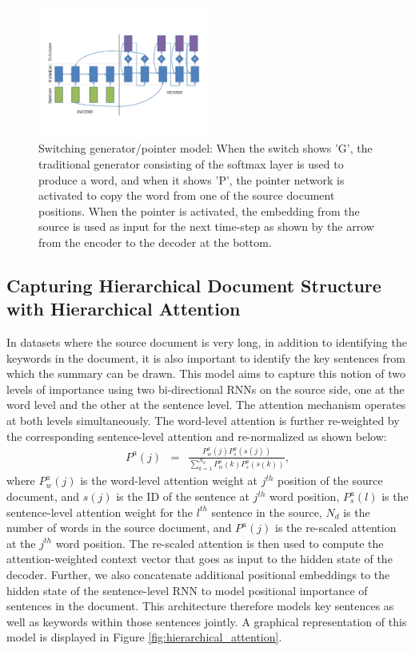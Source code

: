 \begin{figure}[ht]
    \vspace{-0.3in}
	\centering
  \includegraphics[width=0.5\textwidth]{switching_generator_pointer.PDF}
  \vspace{-0.6in}
	\caption{{\small Switching generator/pointer model: When the switch shows 'G', the traditional generator consisting of the softmax layer is used to produce a word, and when it shows 'P', the pointer network is activated to copy the word from one of the source document positions. When the pointer is activated, the embedding from the source is used as input for the next time-step as shown by the arrow from the encoder to the decoder at the bottom.}}
	\label{fig:switching_generator_pointer}
\end{figure}

\subsection{Capturing Hierarchical Document Structure with Hierarchical Attention}\label{sec:hierarchical}
In datasets where the source document is very long, in addition to identifying the keywords in the document, it is also important to identify the key sentences from which the summary can be drawn. This model aims to capture this notion of two levels of importance using two bi-directional RNNs on the source side, one at the word level and the other at the sentence level. The attention mechanism operates at both levels simultaneously. The word-level attention is further re-weighted by the corresponding sentence-level attention and re-normalized as shown below:
\begin{eqnarray}
P^a(j) &=&  \frac{P^a_w(j)P^a_s(s(j))}{\sum_{k=1}^{N_d} P^a_w(k)P^a_s(s(k))},\nonumber
\end{eqnarray}
where $P^a_w(j)$ is the word-level attention weight at $j^{th}$ position of the source document, and $s(j)$ is the ID of the sentence at $j^{th}$ word position, $P^a_s(l)$ is the sentence-level attention weight for the $l^{th}$ sentence in the source, $N_d$ is the number of words in the source document, and $P^a(j)$ is the re-scaled attention at the  $j^{th}$ word position. The re-scaled attention is then used to compute the attention-weighted context vector that goes as input to the hidden state of the decoder. Further, we also concatenate additional positional embeddings to the hidden state of the sentence-level RNN to model positional importance of sentences in the document. This architecture therefore models key sentences as well as keywords within those sentences jointly. A graphical representation of this model is displayed in Figure \ref{fig:hierarchical_attention}. 


